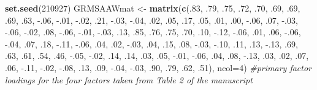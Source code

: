 \documentclass[
  english,
]{book}
\newenvironment{Shaded}{\begin{snugshade}}{\end{snugshade}}
\newcommand{\CommentTok}[1]{\textcolor[rgb]{0.56,0.35,0.01}{\textit{#1}}}
\newcommand{\DataTypeTok}[1]{\textcolor[rgb]{0.13,0.29,0.53}{#1}}
\newcommand{\DecValTok}[1]{\textcolor[rgb]{0.00,0.00,0.81}{#1}}
\newcommand{\FloatTok}[1]{\textcolor[rgb]{0.00,0.00,0.81}{#1}}
\newcommand{\KeywordTok}[1]{\textcolor[rgb]{0.13,0.29,0.53}{\textbf{#1}}}
\newcommand{\NormalTok}[1]{#1}
\newcommand{\StringTok}[1]{\textcolor[rgb]{0.31,0.60,0.02}{#1}}
\begin{document}
\begin{Shaded}
\begin{Highlighting}[]
\KeywordTok{set.seed}\NormalTok{(}\DecValTok{210927}\NormalTok{)}
\NormalTok{GRMSAAWmat <-}\StringTok{ }\KeywordTok{matrix}\NormalTok{(}\KeywordTok{c}\NormalTok{(.}\DecValTok{83}\NormalTok{, }\FloatTok{.79}\NormalTok{, }\FloatTok{.75}\NormalTok{, }\FloatTok{.72}\NormalTok{, }\FloatTok{.70}\NormalTok{, }\FloatTok{.69}\NormalTok{, }\FloatTok{.69}\NormalTok{, }\FloatTok{.69}\NormalTok{, }\FloatTok{.63}\NormalTok{, }\FloatTok{-.06}\NormalTok{, }\FloatTok{-.01}\NormalTok{, }\FloatTok{-.02}\NormalTok{, }\FloatTok{.21}\NormalTok{, }\FloatTok{-.03}\NormalTok{, }\FloatTok{-.04}\NormalTok{, }\FloatTok{.02}\NormalTok{, }\FloatTok{.05}\NormalTok{, }\FloatTok{.17}\NormalTok{, }\FloatTok{.05}\NormalTok{, }\FloatTok{.01}\NormalTok{, }\FloatTok{.00}\NormalTok{, }\FloatTok{-.06}\NormalTok{,}
                       \FloatTok{.07}\NormalTok{, }\FloatTok{-.03}\NormalTok{, }\FloatTok{-.06}\NormalTok{, }\FloatTok{-.02}\NormalTok{, }\FloatTok{.08}\NormalTok{, }\FloatTok{-.06}\NormalTok{, }\FloatTok{-.01}\NormalTok{, }\FloatTok{-.03}\NormalTok{, }\FloatTok{.13}\NormalTok{, }\FloatTok{.85}\NormalTok{, }\FloatTok{.76}\NormalTok{, }\FloatTok{.75}\NormalTok{, }\FloatTok{.70}\NormalTok{, }\FloatTok{.10}\NormalTok{, }\FloatTok{-.12}\NormalTok{, }\FloatTok{-.06}\NormalTok{, }\FloatTok{.01}\NormalTok{, }\FloatTok{.06}\NormalTok{, }\FloatTok{-.06}\NormalTok{, }\FloatTok{-.04}\NormalTok{, }\FloatTok{.07}\NormalTok{, }\FloatTok{.18}\NormalTok{,}
                       \FloatTok{-.11}\NormalTok{, }\FloatTok{-.06}\NormalTok{, }\FloatTok{.04}\NormalTok{, }\FloatTok{.02}\NormalTok{, }\FloatTok{-.03}\NormalTok{, }\FloatTok{.04}\NormalTok{, }\FloatTok{.15}\NormalTok{, }\FloatTok{.08}\NormalTok{, }\FloatTok{-.03}\NormalTok{, }\FloatTok{-.10}\NormalTok{, }\FloatTok{.11}\NormalTok{, }\FloatTok{.13}\NormalTok{, }\FloatTok{-.13}\NormalTok{, }\FloatTok{.69}\NormalTok{, }\FloatTok{.63}\NormalTok{, }\FloatTok{.61}\NormalTok{, }\FloatTok{.54}\NormalTok{, }\FloatTok{.46}\NormalTok{, }\FloatTok{-.05}\NormalTok{, }\FloatTok{-.02}\NormalTok{, }\FloatTok{.14}\NormalTok{, }\FloatTok{.14}\NormalTok{,}
                       \FloatTok{.03}\NormalTok{, }\FloatTok{.05}\NormalTok{, }\FloatTok{-.01}\NormalTok{, }\FloatTok{-.06}\NormalTok{, }\FloatTok{.04}\NormalTok{, }\FloatTok{.08}\NormalTok{, }\FloatTok{-.13}\NormalTok{, }\FloatTok{.03}\NormalTok{, }\FloatTok{.02}\NormalTok{, }\FloatTok{.07}\NormalTok{, }\FloatTok{.06}\NormalTok{, }\FloatTok{-.11}\NormalTok{, }\FloatTok{-.02}\NormalTok{, }\FloatTok{-.08}\NormalTok{, }\FloatTok{.13}\NormalTok{, }\FloatTok{.09}\NormalTok{, }\FloatTok{-.04}\NormalTok{, }\FloatTok{-.03}\NormalTok{, }\FloatTok{.90}\NormalTok{, }\FloatTok{.79}\NormalTok{, }\FloatTok{.62}\NormalTok{, }\FloatTok{.51}\NormalTok{), }\DataTypeTok{ncol=}\DecValTok{4}\NormalTok{) }\CommentTok{#primary factor loadings for the four factors taken from Table 2 of the manuscript}

\end{Highlighting}
\end{Shaded}
\end{document}
